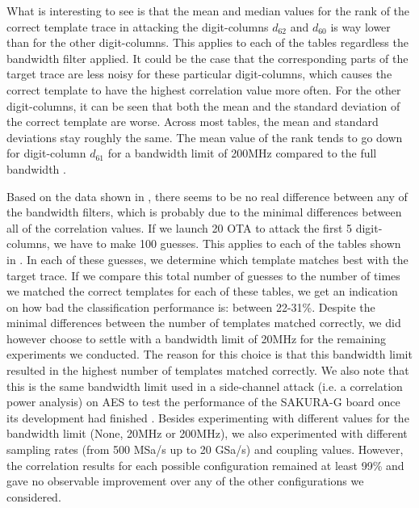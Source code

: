 %
What is interesting to see is that the mean and median values for the rank of the correct template trace in attacking the digit-columns $d_{62}$ and $d_{60} $ is way lower than for the other digit-columns. 
This applies to each of the tables regardless the bandwidth filter applied.
It could be the case that the corresponding parts of the target trace are less noisy for these particular digit-columns, which causes the correct template to have the highest correlation value more often.
For the other digit-columns, it can be seen that both the mean and the standard deviation of the correct template are worse. 
Across most tables, the mean and standard deviations stay roughly the same. 
The mean value of the rank tends to go down for digit-column $d_{61}$ for a bandwidth limit of 200MHz \protect{} compared to the full bandwidth .

Based on the data shown in , there seems to be no real difference between any of the bandwidth filters, which is probably due to the minimal differences between all of the correlation values. 
If we launch 20 OTA to attack the first 5 digit-columns, we have to make 100 guesses.
This applies to each of the tables shown in .
In each of these guesses, we determine which template matches best with the target trace. 
If we compare this total number of guesses to the number of times we matched the correct templates for each of these tables, we get an indication on how bad the classification performance is: between 22-31\%. 
Despite the minimal differences between the number of templates matched correctly, we did however choose to settle with a bandwidth limit of 20MHz for the remaining experiments we conducted.
The reason for this choice is that this bandwidth limit resulted in the highest number of templates matched correctly.
We also note that this is the same bandwidth limit used in a side-channel attack (i.e. a correlation power analysis) on AES to test the performance of the SAKURA-G board once its development had finished \cite{guntur2014side}.
Besides experimenting with different values for the bandwidth limit (None, 20MHz or 200MHz), we also experimented with different sampling rates (from 500 MSa/s up to 20 GSa/s) and coupling values.
However, the correlation results for each possible configuration remained at least 99\% and gave no observable improvement over any of the other configurations we considered.

